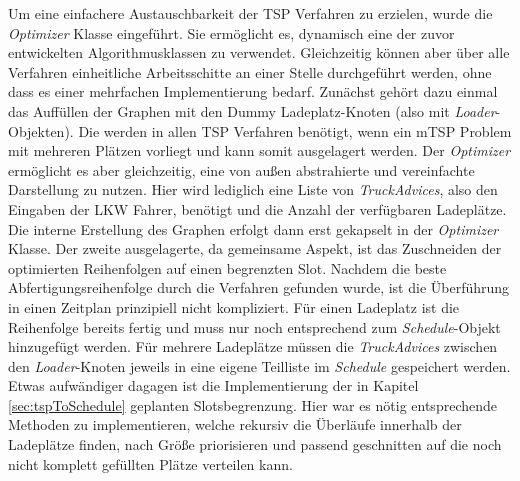 Um eine einfachere Austauschbarkeit der TSP Verfahren zu erzielen, wurde die \textit{Optimizer} Klasse eingeführt. Sie ermöglicht es, dynamisch eine der zuvor entwickelten Algorithmusklassen zu verwendet. Gleichzeitig können aber über alle Verfahren einheitliche Arbeitsschitte an einer Stelle durchgeführt werden, ohne dass es einer mehrfachen Implementierung bedarf. Zunächst gehört dazu einmal das Auffüllen der Graphen mit den Dummy Ladeplatz-Knoten (also mit \textit{Loader}-Objekten). Die werden in allen TSP Verfahren benötigt, wenn ein mTSP Problem mit mehreren Plätzen vorliegt und kann somit ausgelagert werden. Der \textit{Optimizer} ermöglicht es aber gleichzeitig, eine von außen abstrahierte und vereinfachte Darstellung zu nutzen. Hier wird lediglich eine Liste von \textit{TruckAdvices}, also den Eingaben der LKW Fahrer, benötigt und die Anzahl der verfügbaren Ladeplätze. Die interne Erstellung des Graphen erfolgt dann erst gekapselt in der \textit{Optimizer} Klasse. Der zweite ausgelagerte, da gemeinsame Aspekt, ist das Zuschneiden der optimierten Reihenfolgen auf einen begrenzten Slot. Nachdem die beste Abfertigungsreihenfolge durch die Verfahren gefunden wurde, ist die Überführung in einen Zeitplan prinzipiell nicht kompliziert. Für einen Ladeplatz ist die Reihenfolge bereits fertig und muss nur noch entsprechend zum \textit{Schedule}-Objekt hinzugefügt werden. Für mehrere Ladeplätze müssen die \textit{TruckAdvices} zwischen den \textit{Loader}-Knoten jeweils in eine eigene Teilliste im \textit{Schedule} gespeichert werden. Etwas aufwändiger dagagen ist die Implementierung der in Kapitel \ref{sec:tspToSchedule} geplanten Slotsbegrenzung. Hier war es nötig entsprechende Methoden zu implementieren, welche rekursiv die Überläufe innerhalb der Ladeplätze finden, nach Größe priorisieren und passend geschnitten auf die noch nicht komplett gefüllten Plätze verteilen kann.

